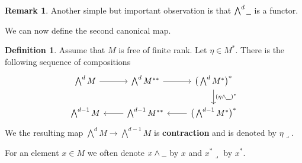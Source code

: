 \documentclass[12pt]{article}
\theoremstyle{plain}
\theoremstyle{definition}
\newtheorem{defn}[thm]{Definition} %
\newtheorem{remark}[thm]{Remark}
\newcommand{\und}[1]{\underline{\hspace{#1 cm}}}
\newcommand{\lto}{\longrightarrow}
\begin{document}
\begin{remark}
Another simple but important observation is that $\bigwedge^d \und{0.2}$ is a functor.
\end{remark}
We can now define the second canonical map.
\begin{defn}
Assume that $M$ is free of finite rank. Let $\eta \in M^\ast$. There is the following sequence of compositions
\begin{equation}\label{eq:contraction}
\begin{tikzcd}
{\bigwedge^d M}\arrow[r] & {\bigwedge^d M^{\ast\ast}}\arrow[r] & {\big(\bigwedge^d M^\ast\big)^\ast}\arrow[d,"{(\eta \wedge \und{0.2})^\ast}"]\\
{\bigwedge^{d-1} M} & {\bigwedge^{d-1}M^{\ast\ast}}\arrow[l]& {\big(\bigwedge^{d-1} M^\ast\big)^{\ast}}\arrow[l]
\end{tikzcd}
\end{equation}
We the resulting map $\bigwedge^d M \lto \bigwedge^{d-1}M$ is \textbf{contraction} and is denoted by $\eta \lrcorner$.

For an element $x \in M$ we often denote $x \wedge \und{0.2}$ by $x$ and $x^\ast \lrcorner$ by $x^\ast$.
\end{defn}
\end{document}
